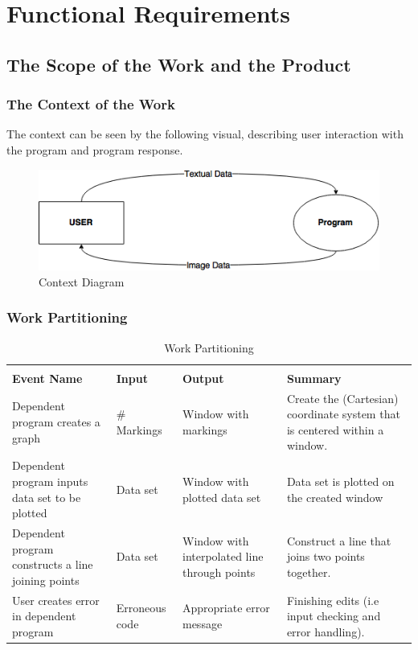 \documentclass[12pt, titlepage]{article}
\begin{document}
\section{Functional Requirements}

\subsection{The Scope of the Work and the Product}

\subsubsection{The Context of the Work}
The context can be seen by the following visual, describing user interaction with the program and program response. \\
		
	\begin{figure}[!htb]
		\includegraphics[scale=0.8]{img/ContextDiagram.png}
		\caption{Context Diagram}
	\end{figure}
	
\subsubsection{Work Partitioning}
	\begin{table}[!htbp]

	\begin{tabularx}{\textwidth}{|X|X|X|X|}
		\hline\\
		\textbf{Event Name} & \textbf{Input} & \textbf{Output} & \textbf{Summary}\\ \hline
	Dependent program creates a graph &  \# Markings & Window with markings & Create the (Cartesian) coordinate system that is centered within a window.\\ \hline
	Dependent program inputs data set to be plotted & Data set & Window with plotted data set & Data set is plotted on the created window \\ \hline
	Dependent program constructs a line joining points & Data set & Window with interpolated line through points & Construct a line that joins two points together.\\ \hline
	User creates error in dependent program & Erroneous code & Appropriate error message & Finishing edits (i.e input checking and error handling).\\ \hline
	\end{tabularx}
		\caption{Work Partitioning}
		\label{Table}
\end{table}
\FloatBarrier
\end{document}
